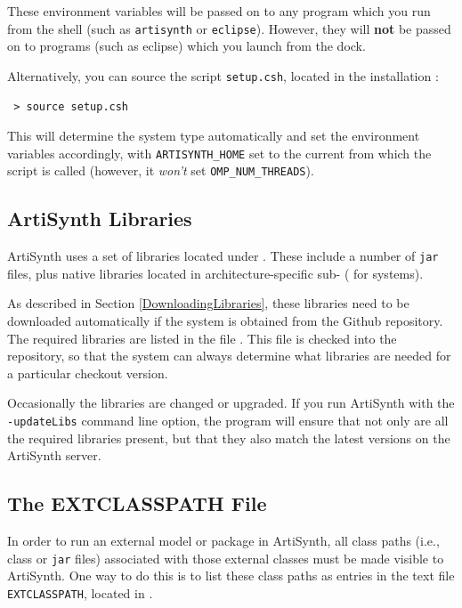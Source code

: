 These environment variables will be passed on to any program which you
run from the shell (such as {\tt artisynth} or {\tt eclipse}).
\ifMacOS
However, they will {\bf not} be passed on to programs (such as eclipse)
which you launch from the dock.
\fi

Alternatively, you can source the script {\tt setup.csh}, located in
the installation \directory{}:

\begin{verbatim}
 > source setup.csh
\end{verbatim}

This will determine the system type automatically and set the
environment variables accordingly, with {\tt ARTISYNTH\_HOME} set to the
current \directory{} from which the script is called (however,
it {\it won't} set {\tt OMP\_NUM\_THREADS}).
\fi

\subsection{ArtiSynth Libraries}

ArtiSynth uses a set of libraries located under
.  These include a number of {\tt jar}
files, plus native libraries located in architecture-specific
sub-\directories{} ({\tt \ARCH{}} for \FULLSYSTEM{} systems).

As described in Section \ref{DownloadingLibraries}, these libraries
need to be downloaded automatically if the system is obtained from the
Github repository. The required libraries are listed in the file
. This file is checked
into the repository, so that the system can always determine what
libraries are needed for a particular checkout version.

Occasionally the libraries are changed or upgraded.  If you run
ArtiSynth with the {\tt -updateLibs} command line option, the program
will ensure that not only are all the required libraries present, but
that they also match the latest versions on the ArtiSynth server.

\subsection{The EXTCLASSPATH File}
\label{EXTCLASSPATHFile}

In order to run an external model or package in ArtiSynth, all class
paths (i.e., class \directories{} or {\tt jar} files) associated with
those external classes must be made visible to ArtiSynth. One way to
do this is to list these class paths as entries in the text file {\tt
EXTCLASSPATH}, located in \ArtHome[].

